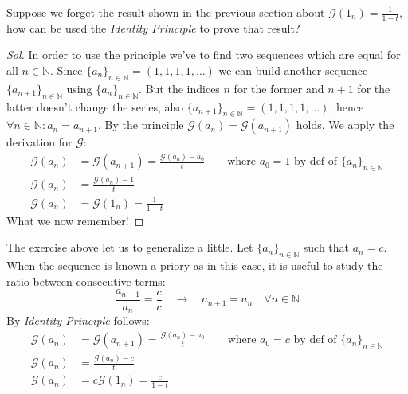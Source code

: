 \begin{exercise}
  Suppose we forget the result shown in the previous section about
  $\mathcal{G} (1_n) = \frac{1}{1-t} $, how can be used the
  \emph{Identity Principle} to prove that result?
\end{exercise}
\begin{proof}[Sol]
  In order to use the principle we've to find two sequences which are
  equal for all $n \in \mathbb{N} $. Since $\{a_n\}_{n\in\mathbb{N} }
  = (1,1,1,1,\ldots)$ we can build another sequence
  $\{a_{n+1}\}_{n\in\mathbb{N} } $ using $\{a_n\}_{n\in\mathbb{N} }
  $. But the indices $n$ for the former and $n+1$ for the latter
  doesn't change the series, also $\{a_{n+1}\}_{n\in\mathbb{N} } =
  (1,1,1,1,\ldots)$, hence $\forall n\in \mathbb{N}: a_n =
  a_{n+1}$. By the principle $\mathcal{G} (a_n) = \mathcal{G}
  (a_{n+1})$ holds. We apply the derivation for $\mathcal{G} $:
  \begin{displaymath}
    \begin{split}
      \mathcal{G} (a_n) &= \mathcal{G} (a_{n+1}) = \frac{\mathcal{G}
        (a_n) - a_0}{t} \quad \quad \text{where } a_0 = 1 \text{ by def of }
      \{a_n\}_{n\in\mathbb{N} } \\
      \mathcal{G} (a_n) &= \frac{\mathcal{G}
        (a_n) -1}{t} \\
      \mathcal{G} (a_n) &= \mathcal{G} (1_n) = \frac{1}{1-t}
    \end{split}
  \end{displaymath}
  What we now remember!
\end{proof}

The exercise above let us to generalize a little. Let
$\{a_n\}_{n\in\mathbb{N} } $ such that $a_n = c$. When the sequence is
known a priory as in this case, it is useful to study the ratio
between consecutive terms:
\begin{displaymath}
   \frac{a_{n+1}}{a_n} =  \frac{c}{c} \quad \rightarrow \quad a_{n+1}
   = a_n \quad \forall n \in \mathbb{N} 
\end{displaymath}
By \emph{Identity Principle} follows:
\begin{displaymath}
  \begin{split}
    \mathcal{G} (a_n) &= \mathcal{G} (a_{n+1}) = \frac{\mathcal{G}
      (a_n) - a_0}{t} \quad \quad \text{where } a_0 = c \text{ by def
      of }
    \{a_n\}_{n\in\mathbb{N} } \\
    \mathcal{G} (a_n) &= \frac{\mathcal{G}
      (a_n) -c}{t} \\
    \mathcal{G} (a_n) &= c\mathcal{G} (1_n) = \frac{c}{1-t}
  \end{split}
\end{displaymath}

